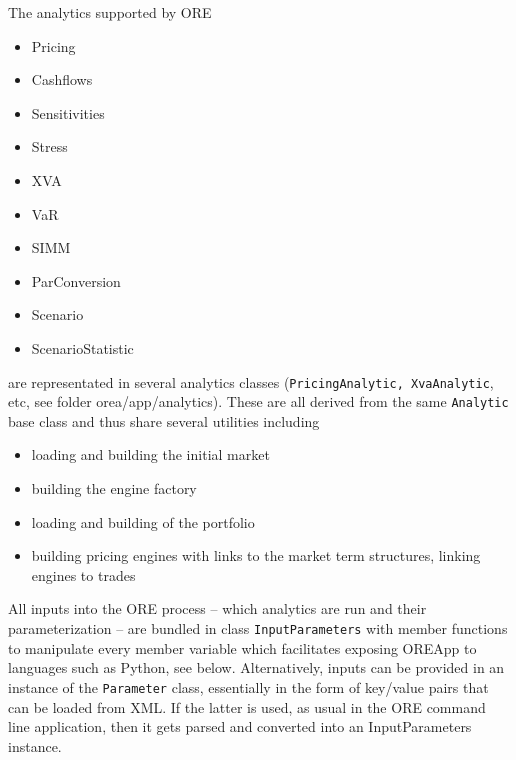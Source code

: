 \documentclass[12pt, a4paper]{report}
\begin{document}
The analytics supported by ORE
\begin{itemize}
\item Pricing
\item Cashflows
\item Sensitivities
\item Stress
\item XVA
\item VaR
\item SIMM
\item ParConversion
\item Scenario
\item ScenarioStatistic
\end{itemize}
are representated in several analytics classes ({\tt PricingAnalytic, XvaAnalytic}, etc, see folder
orea/app/analytics). These are all derived from the same {\tt Analytic} base class and thus share
several utilities including
\begin{itemize}
\item loading and building the initial market
\item building the engine factory
\item loading and building of the portfolio
\item building pricing engines with links to the market term structures, linking engines to trades
\end{itemize}

All inputs into the ORE process -- which analytics are run and their parameterization -- are bundled
in class {\tt InputParameters} with member functions to manipulate every member variable which
facilitates exposing OREApp to languages such as Python, see below.
Alternatively, inputs can be provided in an instance of the {\tt Parameter} class, essentially
in the form of key/value pairs that can be loaded from XML. If the latter is used, as usual in the ORE
command line application, then it gets parsed and converted into an InputParameters instance.
\end{document}
